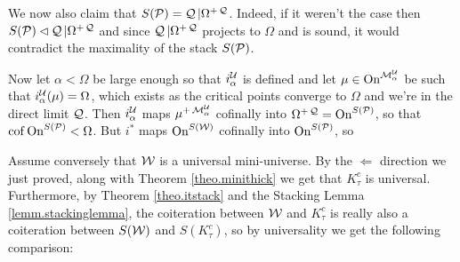
We now also claim that $S(\P)=\Q|\Omega^{+\Q}$. Indeed, if it weren't the case then $S(\P)\pinit\Q|\Omega^{+\Q}$ and since $\Q|\Omega^{+\Q}$ projects to $\Omega$ and is sound, it would contradict the maximality of the stack $S(\P)$.

\qquad Now let $\alpha<\Omega$ be large enough so that $i_\alpha^{\U}$ is defined and let $\mu\in\on^{\M_\alpha^{\U}}$ be such that $i_\alpha^{\U}(\mu)=\Omega$, which exists as the critical points converge to $\Omega$ and we're in the direct limit $\Q$. Then $i_\alpha^{\U}$ maps $\mu^{+\M_\alpha^{\U}}$ cofinally into $\Omega^{+\Q}=\on^{S(\P)}$, so that $\cof\on^{S(\P)}<\Omega$. But $i^*$ maps $\on^{S(\W)}$ cofinally into $\on^{S(\P)}$, so

Assume conversely that $\W$ is a universal mini-universe. By the $\Leftarrow$ direction we just proved, along with Theorem \ref{theo.minithick} we get that $K^c_\tau$ is universal. Furthermore, by Theorem \ref{theo.itstack} and the Stacking Lemma \ref{lemm.stackinglemma}, the coiteration between $\W$ and $K^c_\tau$ is really also a coiteration between $S(\W)$ and $S(K^c_\tau)$, so by universality we get the following comparison:

